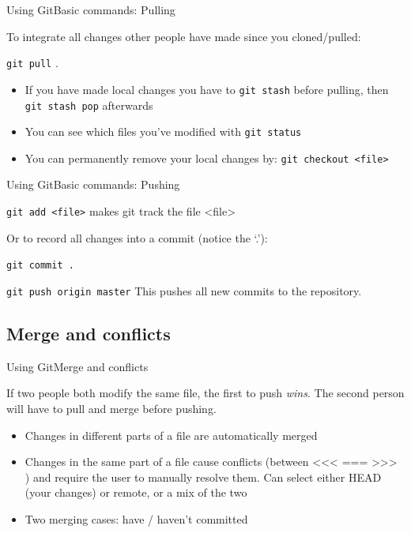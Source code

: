\documentclass{beamer}
\begin{document}
\begin{frame}{Using Git}{Basic commands: Pulling}

To integrate all changes other people have made since you
cloned/pulled:

\texttt{git pull} .

\begin{itemize}
 \item If you have made local changes you have to \texttt{git stash} before
pulling, then \texttt{git stash pop} afterwards
\item You can see which files you've modified with \texttt{git status}
\item You can permanently remove your local changes by: \texttt{git
checkout <file>}
\end{itemize}

\end{frame}


\begin{frame}{Using Git}{Basic commands: Pushing}

\texttt{git add <file>} makes git track the file <file> 

Or to record all changes into a commit (notice the ‘.’):

\texttt{git commit .} 

\texttt{git push origin master} This pushes all new commits to the repository.


\end{frame}


\subsection{Merge and conflicts}
\begin{frame}{Using Git}{Merge and conflicts}

If two people both modify the same file, the first to push \emph{wins}.
The second person will have to pull and merge before pushing.

\begin{itemize}
 \item Changes in different parts of a file are automatically merged
 \item Changes in the same part of a file cause conflicts (between <<<
=== >>> ) and require the user to manually resolve them. Can
select either HEAD (your changes) or remote, or a mix of the two
\item Two merging cases: have / haven't committed
\end{itemize}

\end{frame}
\end{document}
